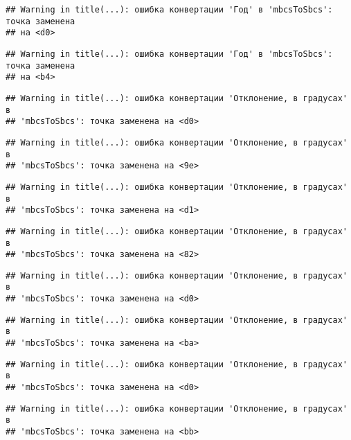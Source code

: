 \documentclass[
]{article}
\begin{document}
\begin{verbatim}
## Warning in title(...): ошибка конвертации 'Год' в 'mbcsToSbcs': точка заменена
## на <d0>
\end{verbatim}

\begin{verbatim}
## Warning in title(...): ошибка конвертации 'Год' в 'mbcsToSbcs': точка заменена
## на <b4>
\end{verbatim}

\begin{verbatim}
## Warning in title(...): ошибка конвертации 'Отклонение, в градусах' в
## 'mbcsToSbcs': точка заменена на <d0>
\end{verbatim}

\begin{verbatim}
## Warning in title(...): ошибка конвертации 'Отклонение, в градусах' в
## 'mbcsToSbcs': точка заменена на <9e>
\end{verbatim}

\begin{verbatim}
## Warning in title(...): ошибка конвертации 'Отклонение, в градусах' в
## 'mbcsToSbcs': точка заменена на <d1>
\end{verbatim}

\begin{verbatim}
## Warning in title(...): ошибка конвертации 'Отклонение, в градусах' в
## 'mbcsToSbcs': точка заменена на <82>
\end{verbatim}

\begin{verbatim}
## Warning in title(...): ошибка конвертации 'Отклонение, в градусах' в
## 'mbcsToSbcs': точка заменена на <d0>
\end{verbatim}

\begin{verbatim}
## Warning in title(...): ошибка конвертации 'Отклонение, в градусах' в
## 'mbcsToSbcs': точка заменена на <ba>
\end{verbatim}

\begin{verbatim}
## Warning in title(...): ошибка конвертации 'Отклонение, в градусах' в
## 'mbcsToSbcs': точка заменена на <d0>
\end{verbatim}

\begin{verbatim}
## Warning in title(...): ошибка конвертации 'Отклонение, в градусах' в
## 'mbcsToSbcs': точка заменена на <bb>
\end{verbatim}
\end{document}
